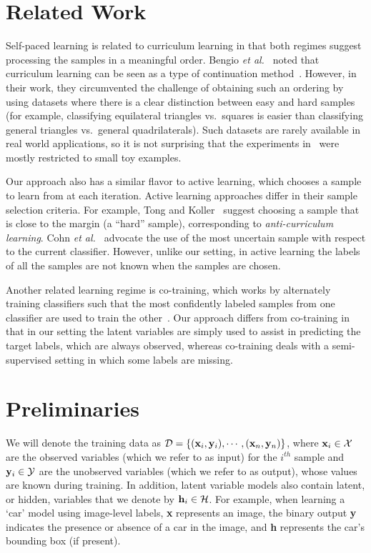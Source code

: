 \documentclass{article}
\newcommand{\mysection}[1]{\vspace{-4mm}\section{#1}\vspace{-4mm}}
\begin{document}
\mysection{Related Work}
\label{sec:relatedwork}
Self-paced learning is related to curriculum learning in that both regimes
suggest processing the samples in a meaningful order.
Bengio {\em et al.\ }\cite{bengioicml09} noted that curriculum learning can be seen as
a type of continuation method~\cite{allgower90}. However, in their work, they circumvented the
challenge of obtaining such an ordering by using datasets where there is a clear distinction
between easy and hard samples (for example, classifying equilateral triangles vs.\ squares is easier than
classifying general triangles vs.\ general quadrilaterals). Such datasets are rarely available in
real world applications, so it is not surprising that the experiments in~\cite{bengioicml09} were mostly
restricted to small toy examples.

Our approach also has a similar flavor to active learning, which
chooses a sample to learn from at each iteration. Active learning approaches differ in their sample selection criteria.
For example, Tong and Koller~\cite{tongjmlr01} suggest choosing a sample that is close to the margin (a ``hard'' sample),
corresponding to {\em anti-curriculum learning}. Cohn {\em et al.\ }\cite{cohnjair96} advocate the use of the 
most uncertain sample with respect to the current classifier. However, unlike our setting, in active learning the labels of all the samples are not known when the samples are
chosen.

Another related learning regime is co-training, which works by alternately training classifiers such that
the most confidently labeled samples from one classifier are used to train the other~\cite{blumcolt98,nigamcikm00}.
Our approach differs from co-training in that in our setting the latent variables are simply used to assist in predicting
the target labels, which are always observed, whereas co-training deals with a semi-supervised setting in which some labels
are missing. 

\mysection{Preliminaries}
\label{sec:preliminaries}

We will denote the training data as ${\cal D} = \{({\bf x}_i,{\bf y}_i),\cdots,({\bf x}_n,{\bf y}_n)\}$, where ${\bf x}_i \in {\cal X}$
are the observed variables (which we refer to as input) for the $i^{th}$ sample
and ${\bf y}_i \in {\cal Y}$ are the unobserved variables (which we refer to as output),
whose values are known during training. In addition, latent variable models also contain latent, or hidden, variables that we
denote by ${\bf h}_i \in {\cal H}$.
For example, when learning a `car' model using image-level labels, {\bf x} represents an image, the binary output {\bf y} indicates the presence or
absence of a car in the image, and {\bf h} represents the car's bounding box (if present).
\end{document}
